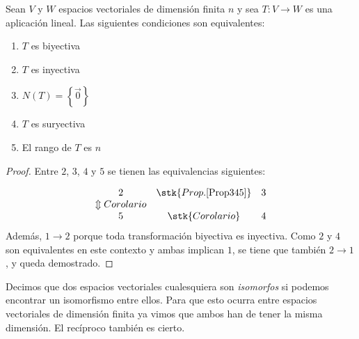 \begin{corollary}
\label{Prop347}





Sean $V$ y $W$ espacios vectoriales  de dimensión finita $n$  y  sea $T: V \rightarrow W$ es  una aplicación lineal. Las siguientes condiciones son equivalentes:

\bigskip

\begin{enumerate}

\item  $T$ es biyectiva


\item  $T$ es inyectiva

\item $N(T)=\left\{\vec{0} \right\}$

\item  $T$ es suryectiva

\item  El rango de $T$ es $n$

\end{enumerate}

\bigskip
\begin{proof}
Entre $2$, $3$, $4$ y $5$ se tienen las equivalencias siguientes:


\[ 
\begin{array}{ccc}
2 & \stk{Prop. \ref{Prop345}} & 3 \\
\Updownarrow{Corolario} &   &  \\
5  & \stk{Corolario}  & 4
\end{array}
\]
Además, $1  \rightarrow 2$ porque toda transformación biyectiva es inyectiva. Como $2$ y $4$ son equivalentes en este contexto y ambas implican $1$, se tiene que también  $2 \rightarrow 1$, y queda demostrado.
\end{proof}
\end{corollary} 


\bigskip


\bigskip



Decimos que dos espacios vectoriales cualesquiera son \textit{isomorfos} si podemos encontrar un isomorfismo entre ellos. Para que esto ocurra entre espacios vectoriales de dimensión finita ya vimos que ambos han de tener la misma dimensión. El recíproco también es cierto.

\bigskip

